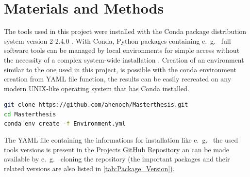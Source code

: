 \chapter{Materials and Methods} \label{chap:Materials_and_Methods}

The tools used in this project were installed with the Conda package distribution system version 2-2.4.0 \autocite{anaconda_software_distribution_anaconda_2020}. With Conda, Python packages containing e.~g.~ full software tools can be managed by local environments for simple access without the necessity of a complex system-wide installation \autocite{anaconda_software_distribution_anaconda_2020}. Creation of an environment similar to the one used in this project, is possible with the conda environment creation from YAML file function, the results can be easily recreated on any modern UNIX-like operating system that has Conda installed. 

\begin{lstlisting}[language=sh]
git clone https://github.com/ahenoch/Masterthesis.git
cd Masterthesis
conda env create -f Environment.yml
\end{lstlisting}  

The YAML file containing the informations for installation like e.~g.~ the used tools versions is present in the \href{https://github.com/ahenoch/Masterthesis.git}{Projects GitHub Repository} an can be made available by e.~g.~ cloning the repository (the important packages and their related versions are also listed in \autoref{tab:Package_Version}).

\begin{table}[!hbt]
    \centering
    \caption[Package Version]{\textbf{Package Version.} The packages that need to be installed by Conda in a specific version for the pipeline to work as expected are listed in this table. Other related packages necessary for execution of the listed ones are meanwhile installed automatically by Conda.}
    \label{tab:Package_Version}
\end{table}

